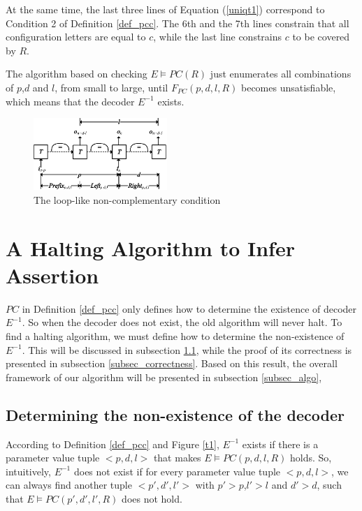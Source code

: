 \documentclass{acm_proc_article-sp}
\begin{document}
At the same time,
the last three lines of Equation (\ref{uniqt1}) correspond to Condition 2 of Definition \ref{def_pcc}.
The 6th and the 7th lines constrain that all configuration letters are equal to $c$,
while the last line constrains $c$ to be covered by $R$.

The algorithm based on checking $E\vDash PC(R)$\cite{ShengYuShen:iccad09,ShengYuShen:tcad} just enumerates all combinations of $p$,$d$ and $l$,
from small to large,
until $F_{PC}(p,d,l,R)$ becomes unsatisfiable,
which means that the decoder $E^{-1}$ exists.

\begin{figure}[b]
\begin{center}
\includegraphics[width=0.45\textwidth]{doubleloop}
\end{center}
\caption{The loop-like non-complementary condition}
  \label{fig_double_loop}
\end{figure}

\section{A Halting Algorithm to Infer Assertion}\label{sec_exist}
$PC$ in Definition \ref{def_pcc} only defines how to determine the existence of decoder $E^{-1}$.
So when the decoder does not exist,
the old algorithm\cite{ShengYuShen:iccad09,ShengYuShen:tcad} will never halt.
To find a halting algorithm,
we must define how to determine the non-existence of $E^{-1}$.
This will be discussed in subsection \ref{subsec_chknonext},
while the proof of its correctness is presented in subsection \ref{subsec_correctness}.
Based on this result,
the overall framework of our algorithm will be presented in subsection \ref{subsec_algo},

\subsection{Determining the non-existence of the decoder}\label{subsec_chknonext}


According to Definition \ref{def_pcc} and Figure \ref{t1},
$E^{-1}$ exists if there is a parameter value tuple $<p,d,l>$ that makes
$E\vDash PC(p,d,l,R)$ holds.
So,
intuitively,
$E^{-1}$ does not exist if for every parameter value tuple $<p,d,l>$,
we can always find another tuple $<p',d',l'>$ with $p'>p$,$l'>l$ and $d'>d$,
such that $E\vDash PC(p',d',l',R)$ does not hold.
\end{document}
